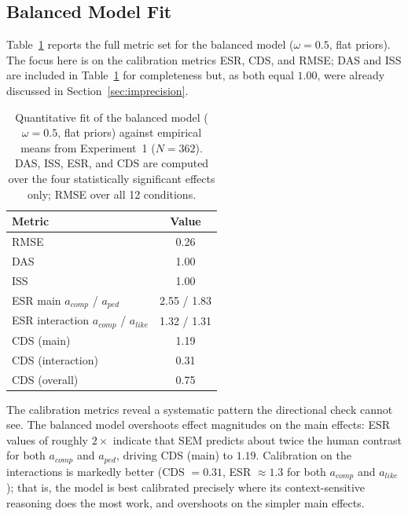 \documentclass[12pt,a4paper]{article}
\begin{document}
\subsection{Balanced Model Fit}
\label{sec:balancedfit}

Table~\ref{tab:balanced_fit} reports the full metric set for the balanced model
($\omega = 0.5$, flat priors). The focus here is on the calibration metrics ESR,
CDS, and RMSE; DAS and ISS are included in Table~\ref{tab:balanced_fit} for
completeness but, as both equal $1.00$, were already discussed in
Section~\ref{sec:imprecision}.

\begin{table}[t!]
\centering
\caption{Quantitative fit of the balanced model ($\omega=0.5$, flat priors)
         against empirical means from Experiment~1 ($N=362$). DAS, ISS, ESR,
         and CDS are computed over the four statistically significant effects
         only; RMSE over all 12 conditions.}
\label{tab:balanced_fit}
\begin{tabular}{lc}
\toprule
Metric & Value \\
\midrule
RMSE             & 0.26 \\
DAS              & 1.00 \\
ISS              & 1.00 \\
ESR main $a_{comp}$ / $a_{ped}$         & 2.55 / 1.83 \\
ESR interaction $a_{comp}$ / $a_{like}$ & 1.32 / 1.31 \\
CDS (main)        & 1.19 \\
CDS (interaction) & 0.31 \\
CDS (overall)     & 0.75 \\
\bottomrule
\end{tabular}
\end{table}

The calibration metrics reveal a systematic pattern the directional check cannot
see. The balanced model overshoots effect magnitudes on the main effects: ESR
values of roughly $2\times$ indicate that SEM predicts about twice the human
contrast for both $a_{comp}$ and $a_{ped}$, driving CDS (main) to $1.19$.
Calibration on the interactions is markedly better (CDS $= 0.31$, ESR $\approx
1.3$ for both $a_{comp}$ and $a_{like}$); that is, the model is best calibrated
precisely where its context-sensitive reasoning does the most work, and
overshoots on the simpler main effects.
\end{document}
